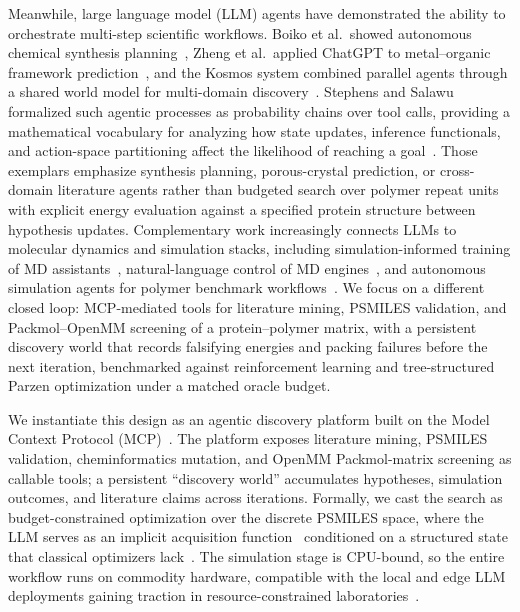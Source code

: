 \documentclass[twocolumn]{fairmeta}
\begin{document}
Meanwhile, large language model (LLM) agents have demonstrated the ability to orchestrate multi-step scientific workflows.
Boiko et al.\ showed autonomous chemical synthesis planning~\cite{boiko2023autonomous}, Zheng et al.\ applied ChatGPT to metal--organic framework prediction~\cite{zheng2023chatgpt}, and the Kosmos system combined parallel agents through a shared world model for multi-domain discovery~\cite{kosmos2025}.
Stephens and Salawu formalized such agentic processes as probability chains over tool calls, providing a mathematical vocabulary for analyzing how state updates, inference functionals, and action-space partitioning affect the likelihood of reaching a goal~\cite{stephens2025mathframing}.
Those exemplars emphasize synthesis planning, porous-crystal prediction, or cross-domain literature agents rather than budgeted search over polymer repeat units with explicit energy evaluation against a specified protein structure between hypothesis updates.
Complementary work increasingly connects LLMs to molecular dynamics and simulation stacks, including simulation-informed training of MD assistants~\cite{mdagent2_2026}, natural-language control of MD engines~\cite{simulon2026}, and autonomous simulation agents for polymer benchmark workflows~\cite{liu2024asa}.
We focus on a different closed loop: MCP-mediated tools for literature mining, PSMILES validation, and Packmol--OpenMM screening of a protein--polymer matrix, with a persistent discovery world that records falsifying energies and packing failures before the next iteration, benchmarked against reinforcement learning and tree-structured Parzen optimization under a matched oracle budget.

We instantiate this design as an agentic discovery platform built on the Model Context Protocol (MCP)~\cite{mcp2024}.
The platform exposes literature mining, PSMILES validation, cheminformatics mutation, and OpenMM Packmol-matrix screening as callable tools; a persistent ``discovery world'' accumulates hypotheses, simulation outcomes, and literature claims across iterations.
Formally, we cast the search as budget-constrained optimization over the discrete PSMILES space, where the LLM serves as an implicit acquisition function~\cite{yang2024opro} conditioned on a structured state that classical optimizers lack~\cite{shahriari2016bayesopt}.
The simulation stage is CPU-bound, so the entire workflow runs on commodity hardware, compatible with the local and edge LLM deployments gaining traction in resource-constrained laboratories~\cite{xu2024ondevice}.
\end{document}
